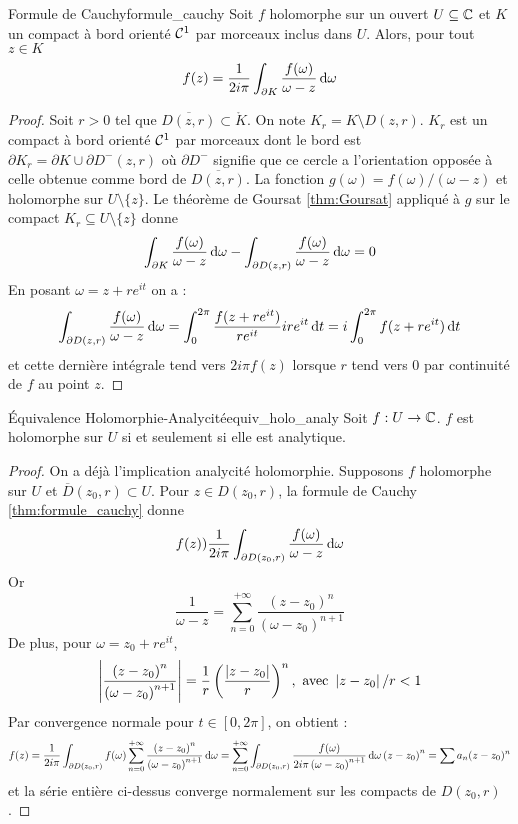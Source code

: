 \documentclass{cours}
\begin{document}
\begin{théorème}{Formule de Cauchy}{formule_cauchy}
    Soit $f$ holomorphe sur un ouvert $U \subseteq \mathbb{C}$ et $K$ un compact à bord orienté $\mathcal{C}^{1}$ par morceaux inclus dans $U$. Alors, pour tout $z \in K$ 
    \[
        f(z) = \frac{1}{2i\pi}\int_{\partial K}\frac{f(\omega)}{\omega -  z}{\rm \, d} \omega
    \]
\end{théorème}
\begin{proof}
    Soit $r > 0$ tel que $\overline{D(z, r)} \subset \mathring{K}$. On note $K_{r} = K \setminus D(z, r)$. $K_{r}$ est un compact à bord orienté $\mathcal{C}^{1}$ par morceaux dont le bord est $\partial K_{r} = \partial K \cup \partial D^{-}(z, r)$ où $\partial D^{-}$ signifie que ce cercle a l'orientation opposée à celle obtenue comme bord de $\overline{D(z,r)}$. La fonction $g(\omega) = f(\omega)/\left(\omega - z\right)$ et holomorphe sur $U \setminus \{z\}$. Le théorème de Goursat \ref{thm:Goursat} appliqué à $g$ sur le compact $K_{r} \subseteq U \setminus \{z\}$ donne 
    \[
        \int_{\partial K}\frac{f(\omega)}{\omega - z}{\rm \, d} \omega - \int_{\partial D(z, r)} \frac{f(\omega)}{\omega - z}{\rm \, d} \omega = 0
    \]
    En posant $\omega = z + re^{it}$ on a : 
    \[
        \int_{\partial D(z, r)}\frac{f(\omega)}{\omega - z}{\rm \, d} \omega = \int_{0}^{2\pi}\frac{f(z + re^{it})}{re^{it}}ire^{it}{\rm \, d} t = i \int_{0}^{2\pi}f(z + re^{it}) {\rm \, d} t
    \]
    et cette dernière intégrale tend vers $2i\pi f(z)$ lorsque $r$ tend vers $0$ par continuité de $f$ au point $z$. 
\end{proof}
\begin{théorème}{Équivalence Holomorphie-Analycité}{equiv_holo_analy}
    Soit $f : U \to \mathbb{C}$. $f$ est holomorphe sur $U$ si et seulement si elle est analytique.
\end{théorème}
\begin{proof}
    On a déjà l'implication analycité holomorphie. Supposons $f$ holomorphe sur $U$ et $\overline{D}(z_{0}, r) \subset U$. Pour $z \in D(z_{0}, r)$, la formule de Cauchy \ref{thm:formule_cauchy} donne 
    \[
        f(z) ) \frac{1}{2i\pi}\int_{\partial D(z_{0}, r)}\frac{f(\omega)}{\omega - z}{\rm \, d} \omega
    \]
    Or 
    \[
        \frac{1}{\omega - z} = \sum_{n = 0}^{+ \infty}\frac{\left(z - z_{0}\right)^{n}}{\left(\omega - z_{0}\right)^{n + 1}}
    \]
    De plus, pour $\omega = z_{0} + re^{it}$,
    \[
        \left|\frac{\left(z - z_{0}\right)^{n}}{\left(\omega - z_{0}\right)^{n + 1}}\right| = \frac{1}{r}\left(\frac{\left|z - z_{0}\right|}{r}\right)^{n}, \text{ avec } \left|z - z_{0}\right|/r < 1
    \]
    Par convergence normale pour $t \in [0, 2\pi]$, on obtient :
    \[
        f(z) = \frac{1}{2i\pi}\int_{\partial D(z_{0},r )}f(\omega)\sum_{n = 0}^{+ \infty}\frac{\left(z - z_{0}\right)^{n}}{\left(\omega - z_{0}\right)^{n + 1}}{\rm \, d} \omega = \sum_{n = 0}^{+ \infty}\int_{\partial D(z_{0}, r)}\frac{f(\omega)}{2i\pi\left(\omega - z_{0}\right)^{n + 1}}{\rm \, d} \omega\left(z - z_{0}\right)^{n} = \sum a_{n}(z - z_{0})^{n}
    \]
    et la série entière ci-dessus converge normalement sur les compacts de $D(z_{0}, r)$.
\end{proof}
\end{document}
